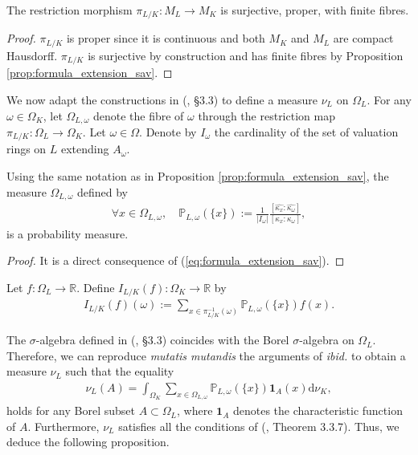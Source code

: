 \documentclass [11pt,reqno]{amsart}
\def\bP{{\mathbb{P}}}
\def\bR{{\mathbb{R}}}
\newcommand{\1}{\mathmybb{1}}
\def\diff{\mathrm{d}}
\begin{document}
\begin{proposition}
\label{prop:projection_morphism_finite_separable_extension}
The restriction morphism $\pi_{L/K} : M_L \to M_K$ is surjective, proper, with finite fibres.
\end{proposition}

\begin{proof}
$\pi_{L/K}$ is proper since it is continuous and both $M_K$ and $M_L$ are compact Hausdorff. $\pi_{L/K}$ is surjective by construction and has finite fibres by Proposition \ref{prop:formula_extension_sav}.
\end{proof}

We now adapt the constructions in (\cite{ChenMori}, \S 3.3) to define a measure $\nu_L$ on $\Omega_L$. For any $\omega\in \Omega_K$, let $\Omega_{L,\omega}$ denote the fibre of $\omega$ through the restriction map $\pi_{L/K} : \Omega_L \to \Omega_K$. Let $\omega\in\Omega$. Denote by $I_\omega$ the cardinality of the set of valuation rings on $L$ extending $A_{\omega}$. 

\begin{proposition}
Using the same notation as in Proposition \ref{prop:formula_extension_sav}, the measure $\Omega_{L,\omega}$ defined by
\begin{align*}
\forall x\in \Omega_{L,\omega},\quad  \bP_{L,\omega}(\{x\}) := \frac{1}{|I_\omega|} \frac{[\widehat{\kappa_x}:\widehat{\kappa_{\omega}}]}{[\kappa_x:\kappa_{\omega}]},
\end{align*}
is a probability measure. 
\end{proposition}

\begin{proof}
It is a direct consequence of (\ref{eq:formula_extension_sav}).
\end{proof}

\begin{definition}
\label{def:disintegration_kernel}
Let $f : \Omega_{L} \to \bR$. Define $I_{L/K}(f) : \Omega_{K}\to \bR$ by 
\begin{align*}
I_{L/K}(f)(\omega) := \displaystyle\sum_{x\in \pi^{-1}_{L/K}(\omega)} \bP_{L,\omega}(\{x\})f(x).
\end{align*}
\end{definition}

The $\sigma$-algebra defined in (\cite{ChenMori}, \S 3.3) coincides with the Borel $\sigma$-algebra on $\Omega_L$. Therefore, we can reproduce \emph{mutatis mutandis} the arguments of \emph{ibid.} to obtain a measure $\nu_L$ such that the equality
\begin{align}
\label{eq:measure_finite_separable_extension}
\nu_L(A) = \int_{\Omega_K} \displaystyle\sum_{x\in \Omega_{L,\omega}}\bP_{L,\omega}(\{x\})\mathbf{1}_A(x) \diff \nu_K,
\end{align}
holds for any Borel subset $A \subset \Omega_L$, where $\mathbf{1}_{A}$ denotes the characteristic function of $A$. Furthermore, $\nu_L$ satisfies all the conditions of (\cite{ChenMori}, Theorem 3.3.7). Thus, we deduce the following proposition.
\end{document}

